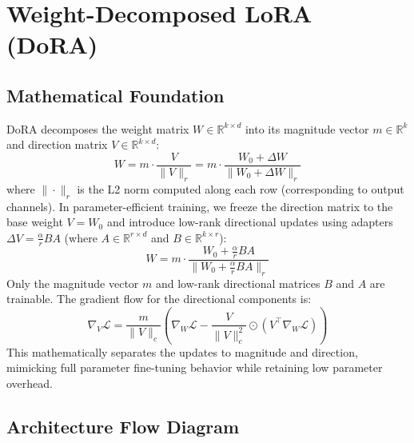 \newpage
\section{Weight-Decomposed LoRA (DoRA)}

\subsection{Mathematical Foundation}
DoRA decomposes the weight matrix $W \in \mathbb{R}^{k \times d}$ into its magnitude vector $m \in \mathbb{R}^k$ and direction matrix $V \in \mathbb{R}^{k \times d}$:
\begin{equation}
  W = m \cdot \frac{V}{\|V\|_r} = m \cdot \frac{W_0 + \Delta W}{\|W_0 + \Delta W\|_r}
\end{equation}
where $\|\cdot\|_r$ is the L2 norm computed along each row (corresponding to output channels). In parameter-efficient training, we freeze the direction matrix to the base weight $V = W_0$ and introduce low-rank directional updates using adapters $\Delta V = \frac{\alpha}{r} B A$ (where $A \in \mathbb{R}^{r \times d}$ and $B \in \mathbb{R}^{k \times r}$):
\begin{equation}
  W = m \cdot \frac{W_0 + \frac{\alpha}{r} B A}{\|W_0 + \frac{\alpha}{r} B A\|_r}
\end{equation}
Only the magnitude vector $m$ and low-rank directional matrices $B$ and $A$ are trainable.
The gradient flow for the directional components is:
\begin{equation}
  \nabla_V \mathcal{L} = \frac{m}{\|V\|_c} \left( \nabla_W \mathcal{L} - \frac{V}{\|V\|_c^2} \odot \left( V^\top \nabla_W \mathcal{L} \right) \right)
\end{equation}
This mathematically separates the updates to magnitude and direction, mimicking full parameter fine-tuning behavior while retaining low parameter overhead.

\subsection{Architecture Flow Diagram}

